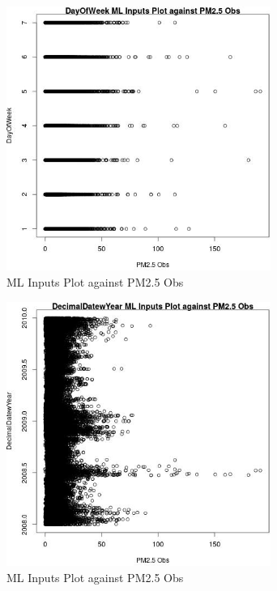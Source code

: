 \begin{figure} 
\centering  
\includegraphics[width=0.77\textwidth]{Code_Outputs/Report_ML_input_PM25_Step4_part_e_de_duplicated_aves_DayOfWeekvPM25_Obs.jpg} 
\caption{\label{fig:Report_ML_input_PM25_Step4_part_e_de_duplicated_avesDayOfWeekvPM25_Obs}ML Inputs Plot against PM2.5 Obs} 
\end{figure} 
 

\begin{figure} 
\centering  
\includegraphics[width=0.77\textwidth]{Code_Outputs/Report_ML_input_PM25_Step4_part_e_de_duplicated_aves_DecimalDatewYearvPM25_Obs.jpg} 
\caption{\label{fig:Report_ML_input_PM25_Step4_part_e_de_duplicated_avesDecimalDatewYearvPM25_Obs}ML Inputs Plot against PM2.5 Obs} 
\end{figure} 
 

